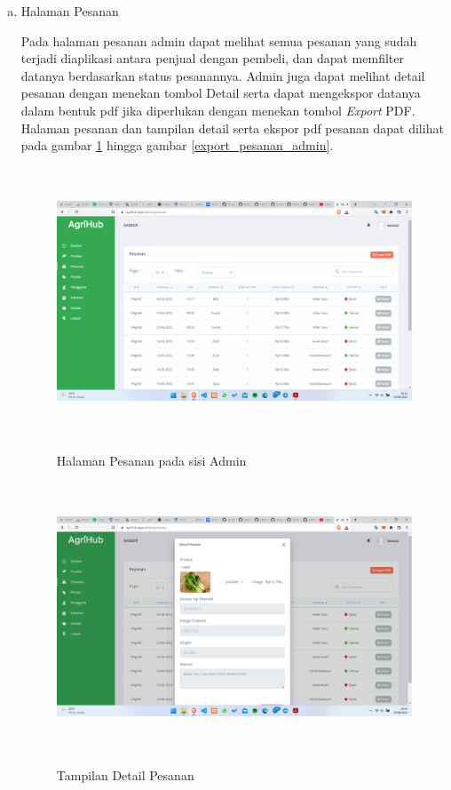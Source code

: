 \begin{enumerate}
\begin{enumerate}[a.]
		\item Halaman Pesanan
		\par Pada halaman pesanan admin dapat melihat semua pesanan yang sudah terjadi diaplikasi antara penjual dengan pembeli, dan dapat memfilter datanya berdasarkan status pesanannya. Admin juga dapat melihat detail pesanan dengan menekan tombol Detail serta dapat mengekspor datanya dalam bentuk pdf jika diperlukan dengan menekan tombol \textit{Export} PDF. Halaman pesanan dan tampilan detail serta ekspor pdf pesanan dapat dilihat pada gambar \ref*{pesanan_admin} hingga gambar \ref*{export_pesanan_admin}.
		\begin{figure}[H]
			\centering
			{\includegraphics [width = 13.5cm, height= 8cm]{gambar/admin/pesanan_admin}}
			\caption{Halaman Pesanan pada sisi Admin}
			\label{pesanan_admin}
		\end{figure}
		\begin{figure}[H]
			\centering
			{\includegraphics [width = 13.5cm, height= 8cm]{gambar/admin/detail_pesanan}}
			\caption{Tampilan Detail Pesanan}

\end{figure}
\end{enumerate}
\end{enumerate}
